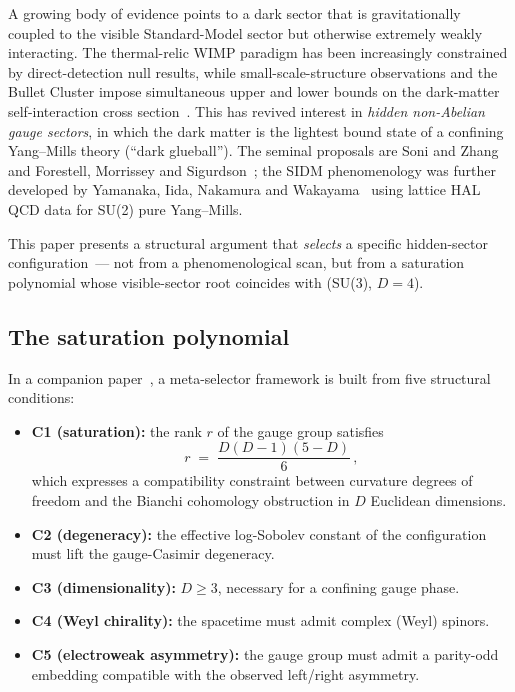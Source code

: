 \documentclass[aps,prd,twocolumn,nofootinbib,superscriptaddress,floatfix]{revtex4-2}
\begin{document}
A growing body of evidence points to a dark sector that is gravitationally coupled to the visible Standard-Model sector but otherwise extremely weakly interacting. The thermal-relic WIMP paradigm has been increasingly constrained by direct-detection null results, while small-scale-structure observations and the Bullet Cluster impose simultaneous upper and lower bounds on the dark-matter self-interaction cross section~\cite{Markevitch2004,TulinYu2018}. This has revived interest in \emph{hidden non-Abelian gauge sectors}, in which the dark matter is the lightest bound state of a confining Yang--Mills theory (``dark glueball''). The seminal proposals are Soni and Zhang~\cite{SoniZhang2016} and Forestell, Morrissey and Sigurdson~\cite{FMS2016}; the SIDM phenomenology was further developed by Yamanaka, Iida, Nakamura and Wakayama~\cite{Yamanaka2019} using lattice HAL QCD data for SU(2) pure Yang--Mills.

This paper presents a structural argument that \emph{selects} a specific hidden-sector configuration~--- not from a phenomenological scan, but from a saturation polynomial whose visible-sector root coincides with (SU(3), $D=4$).

\subsection{The saturation polynomial}

In a companion paper~\cite{Remondiere2026companion}, a meta-selector framework is built from five structural conditions:
\begin{itemize}
    \item \textbf{C1 (saturation):} the rank $r$ of the gauge group satisfies
    \begin{equation}
        r \;=\; \frac{D(D-1)(5-D)}{6}\,,
        \label{eq:saturation}
    \end{equation}
    which expresses a compatibility constraint between curvature degrees of freedom and the Bianchi cohomology obstruction in $D$ Euclidean dimensions.
    \item \textbf{C2 (degeneracy):} the effective log-Sobolev constant of the configuration must lift the gauge-Casimir degeneracy.
    \item \textbf{C3 (dimensionality):} $D\geq 3$, necessary for a confining gauge phase.
    \item \textbf{C4 (Weyl chirality):} the spacetime must admit complex (Weyl) spinors.
    \item \textbf{C5 (electroweak asymmetry):} the gauge group must admit a parity-odd embedding compatible with the observed left/right asymmetry.
\end{itemize}
\end{document}

